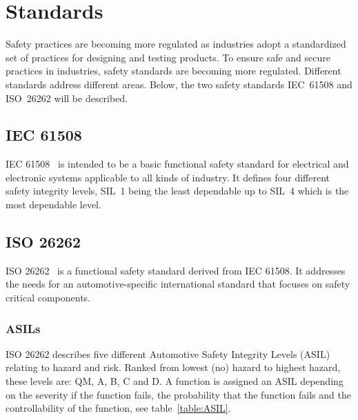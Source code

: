 \section{Standards}
Safety practices are becoming more regulated as industries adopt a standardized set of practices for designing and testing products. %
To ensure safe and secure practices in industries, safety standards are becoming more regulated. Different standards address different areas. Below, the two safety standards IEC~61508 and ISO~26262 will be described.

\subsection{IEC 61508}
IEC 61508~\cite{IEC61508} is intended to be a basic functional safety standard for electrical and electronic systems applicable to all kinds of industry. It defines four different safety integrity levels, SIL~1 being the least dependable up to SIL~4 which is the most dependable level.

\subsection{ISO 26262}
ISO 26262~\cite{ISO26262} is a functional safety standard derived from IEC 61508. It addresses the needs for an automotive-specific international standard that focuses on safety critical components. 

\subsubsection{ASILs}
ISO 26262 describes five different Automotive Safety Integrity Levels (ASIL) relating to hazard and risk. Ranked from lowest (no) hazard to highest hazard, these levels are: QM, A, B, C and D. A function is assigned an ASIL depending on the severity if the function fails, the probability that the function fails and the controllability of the function, see table~\ref{table:ASIL}.

